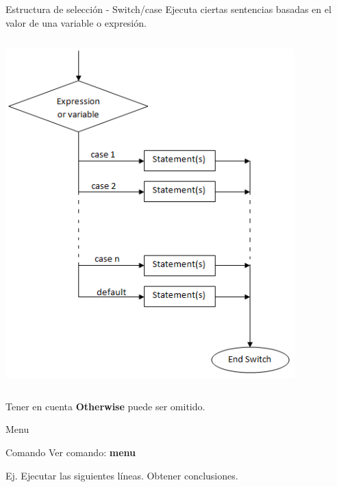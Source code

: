 \documentclass{bredelebeamer}
\begin{document}
\begin{frame}{Estructura de selección - Switch/case}
Ejecuta ciertas sentencias basadas en el valor de una variable o expresión.
\begin{columns}
\begin{column}{0.5\textwidth}
\begin{center}
\includegraphics[scale=0.2]{images/pantalla7.png}
\end{center}
\end{column}
\begin{column}{0.5\textwidth}

\end{column}
\end{columns}

\begin{block}{Tener en cuenta}
\textbf{Otherwise} puede ser omitido.
\end{block}
\end{frame}

\begin{frame}{Menu}
\begin{exampleblock}{Comando}
Ver comando: \textbf{menu}
\end{exampleblock}

Ej. Ejecutar las siguientes líneas. Obtener conclusiones.

\end{frame}
\end{document}
